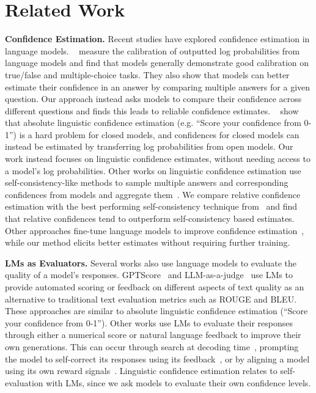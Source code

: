 \section{Related Work}
\textbf{Confidence Estimation.}  Recent studies have explored confidence estimation in language models. ~\citet{kadavath2022language} measure the calibration of outputted log probabilities from language models and find that models generally demonstrate good calibration on true/false and multiple-choice tasks. They also show that models can better estimate their confidence in an answer by comparing multiple answers for a given question. Our approach instead asks models to compare their confidence across different questions and finds this leads to reliable confidence estimates. ~\cite{surrogate-models} show that absolute linguistic confidence estimation (e.g. “Score your confidence from 0-1”) is a hard problem for closed models, and confidences for closed models can instead be estimated by transferring log probabilities from open models. Our work instead focuses on linguistic confidence estimates, without needing access to a model’s log probabilities. Other works on linguistic confidence estimation use self-consistency-like methods to sample multiple answers and corresponding confidences from models and aggregate them~\citep{xiong2023can}. We compare relative confidence estimation with the best performing self-consistency technique from~\cite{xiong2023can} and find that relative confidences tend to outperform self-consistency based estimates. Other approaches fine-tune language models to improve confidence estimation~\citep{lin2022teaching}, while our method elicits better estimates without requiring further training. 

\textbf{LMs as Evaluators. } Several works also use language models to evaluate the quality of a model’s responses. GPTScore~\citep{Fu2023GPTScoreEA} and LLM-as-a-judge~\citep{Zheng2023JudgingLW} use LMs to provide automated scoring or feedback on different aspects of text quality as an alternative to traditional text evaluation metrics such as ROUGE and BLEU. These approaches are similar to absolute linguistic confidence estimation (“Score your confidence from 0-1”). Other works use LMs to evaluate their responses through either a numerical score or natural language feedback to improve their own generations. This can occur through search at decoding time~\citep{Yao2023TreeOT}, prompting the model to self-correct its responses using its feedback~\citep{Madaan2023SelfRefineIR, Bai2022ConstitutionalAH}, or by aligning a model using its own reward signals~\citep{Yuan2024SelfRewardingLM}. Linguistic confidence estimation relates to self-evaluation with LMs, since we ask models to evaluate their own confidence levels. 

